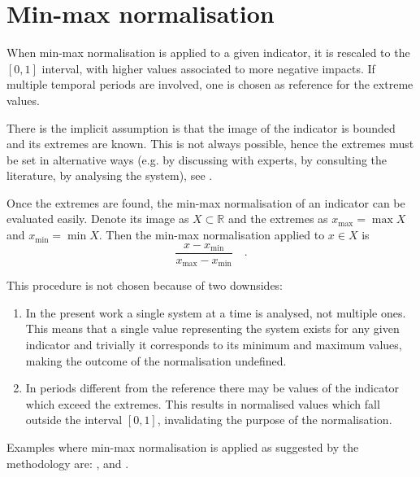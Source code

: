 \appendix



\section{Min-max normalisation}
\label{sec:Min-max normalisation}
When min-max normalisation is applied to a given \gls{indicator}, it is rescaled to the $[0, 1]$ interval, with higher values associated to more negative \glspl{impact}. If multiple temporal periods are involved, one is chosen as reference for the extreme values.\cite[85]{2008OECDHandbookOn}

There is the implicit assumption is that the image of the \gls{indicator} is bounded and its extremes are known. This is not always possible, hence the extremes must be set in alternative ways (e.g. by discussing with experts, by consulting the literature, by analysing the system), see \cite[113-115]{2017GIZTheVulnerability}.

Once the extremes are found, the min-max normalisation of an \gls{indicator} can be evaluated easily. Denote its image as $X \subset \mathbb{R}$ and the extremes as $x_\text{max} = \max X$ and $x_\text{min} = \min X$. Then the min-max normalisation applied to $x \in X$ is
\begin{equation}
  \label{eq:min-max}
  \frac{x - x_\text{min}}{x_\text{max} - x_\text{min}}
  \quad .
\end{equation}

This procedure is not chosen because of two downsides:
\begin{enumerate}
  \item In the present work a single system at a time is analysed, not multiple ones. This means that a single value representing the system exists for any given \gls{indicator} and trivially it corresponds to its minimum and maximum values, making the outcome of the normalisation undefined.
  \item In periods different from the reference there may be values of the \gls{indicator} which exceed the extremes. This results in normalised values which fall outside the interval $[0, 1]$, invalidating the purpose of the normalisation.
\end{enumerate}

Examples where min-max normalisation is applied as suggested by the methodology are: \cite[6]{2023DeVivoApplicationOf}, \cite[6]{2023DeVivoClimate-RiskAssessment} and \cite[74]{2017GIZVulnerabilitySourcebook}.
